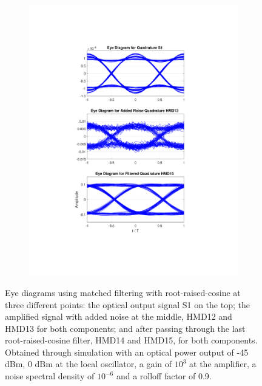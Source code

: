 \begin{figure}[H]
\begin{subfigure}{.45\textwidth}
		\includegraphics[clip, trim=5cm 4cm 5cm 4cm, width=\textwidth]{./sdf/m_qam_system/figures/eyes/q_p_45_09.pdf}
	\end{subfigure}
	
	\caption{Eye diagrams using matched filtering with root-raised-cosine at three different points: the optical output signal S1 on the top; the amplified signal with added noise at the middle, HMD12 and HMD13 for both components; and after passing through the last root-raised-cosine filter, HMD14 and HMD15, for both components. Obtained through simulation with an optical power output of -45 dBm, 0 dBm at the local oscillator, a gain of $10^3$ at the amplifier, a noise spectral density of $10^{-6}$ and a rolloff factor of 0.9.\label{fig:eyes_n_rrc_45_09}}
	
\end{figure}

